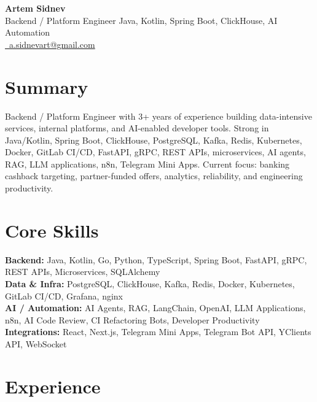 \documentclass[10pt,a4paper]{article}
\newcommand{\contactsep}{\enspace\textbar\enspace}
\newcommand{\social}[2]{\href{#1}{#2}}
\begin{document}
\fontsize{8.85pt}{10.35pt}\selectfont

\begin{center}
{\LARGE \textbf{Artem Sidnev}}\\[-0.02em]
{\normalsize Backend / Platform Engineer \textbar{} Java, Kotlin, Spring Boot, ClickHouse, AI Automation}\\[0.26em]
{\footnotesize
\href{mailto:a.sidnevart@gmail.com}{\faEnvelope\ a.sidnevart@gmail.com}
\contactsep \social{https://t.me/sidnevart}{\faTelegram}
\contactsep \social{https://www.linkedin.com/in/artem-sidnev}{\faLinkedin}
\contactsep \social{https://github.com/sidnevart}{\faGithub}
\contactsep \social{https://sidnev.dev}{\faGlobe}
}
\end{center}

\vspace{0.05em}

\section*{Summary}
Backend / Platform Engineer with 3+ years of experience building data-intensive services, internal platforms, and AI-enabled developer tools. Strong in Java/Kotlin, Spring Boot, ClickHouse, PostgreSQL, Kafka, Redis, Kubernetes, Docker, GitLab CI/CD, FastAPI, gRPC, REST APIs, microservices, AI agents, RAG, LLM applications, n8n, Telegram Mini Apps. Current focus: banking cashback targeting, partner-funded offers, analytics, reliability, and engineering productivity.

\section*{Core Skills}
\textbf{Backend:} Java, Kotlin, Go, Python, TypeScript, Spring Boot, FastAPI, gRPC, REST APIs, Microservices, SQLAlchemy \\
\textbf{Data \& Infra:} PostgreSQL, ClickHouse, Kafka, Redis, Docker, Kubernetes, GitLab CI/CD, Grafana, nginx \\
\textbf{AI / Automation:} AI Agents, RAG, LangChain, OpenAI, LLM Applications, n8n, AI Code Review, CI Refactoring Bots, Developer Productivity \\
\textbf{Integrations:} React, Next.js, Telegram Mini Apps, Telegram Bot API, YClients API, WebSocket

\section*{Experience}
\end{document}
